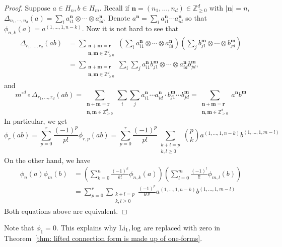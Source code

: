 \begin{proof}
Suppose $a\in H_n,b\in H_m$. Recall if $\mathbf n=(n_1,\dots,n_d)\in\mathbb Z_{\geq0}^d$ with $|\mathbf n|=n$, $\Delta_{n_1,\cdots,n_d}(a)=\sum_ia^{\mathbf n}_{i1}\otimes\cdots\otimes a^{\mathbf n}_{id}$. Denote $a^{\mathbf n}=\sum_ia^{\mathbf n}_{i1}\cdots a^{\mathbf n}_{id}$ so that $\phi_{n,k}(a)=a^{(1,\dots,1,n-k)}$. Now it is not hard to see that
\begin{align*}
\Delta_{r_1,\dots,r_d}(ab)&=\sum_{\substack{\mathbf n+\mathbf m=\mathbf r\\\mathbf n,\mathbf m\in\mathbb Z^d_{\geq0}}}\left(\sum_ia^{\mathbf n}_{i1}\otimes\cdots\otimes a^{\mathbf n}_{id}\right)\left(\sum_jb^{\mathbf m}_{j1}\otimes\cdots\otimes b^{\mathbf m}_{jd}\right)\\
&=\sum_{\substack{\mathbf n+\mathbf m=\mathbf r\\\mathbf n,\mathbf m\in\mathbb Z^d_{\geq0}}}\sum_i\sum_ja^{\mathbf n}_{i1}b^{\mathbf m}_{j1}\otimes\cdots\otimes a^{\mathbf n}_{id}b^{\mathbf m}_{jd},
\end{align*}
and
\[
m^{\circ d}\circ\Delta_{r_1,\dots,r_d}(ab)=\sum_{\substack{\mathbf n+\mathbf m=\mathbf r\\\mathbf n,\mathbf m\in\mathbb Z^d_{\geq0}}}\sum_i\sum_ja^{\mathbf n}_{i1}\cdots a^{\mathbf n}_{id}\cdot b^{\mathbf m}_{j1}\cdots b^{\mathbf m}_{jd}=\sum_{\substack{\mathbf n+\mathbf m=\mathbf r\\\mathbf n,\mathbf m\in\mathbb Z^d_{\geq0}}}a^{\mathbf n}b^{\mathbf m}
\]
In particular, we get
\begin{equation}
\phi_r(ab)=\sum_{p=0}^r\frac{(-1)^p}{p!}\phi_{r,p}(ab)=\sum_{p=0}^r\frac{(-1)^p}{p!}\sum_{\substack{k+l=p\\k,l\geq0}}\binom{p}{k}a^{(1,\dots,1,n-k)}b^{(1,\dots,1,m-l)}
\end{equation}
On the other hand, we have
\begin{equation}
\begin{aligned}
\phi_n(a)\phi_m(b)&=\left(\sum_{k=0}^n\frac{(-1)^k}{k!}\phi_{n,k}(a)\right)\left(\sum_{l=0}^m\frac{(-1)^l}{l!}\phi_{m,l}(b)\right)\\
&=\sum_{p=0}^r\sum_{\substack{k+l=p\\k,l\geq0}}\frac{(-1)^p}{k!l!}a^{(1,\dots,1,n-k)}b^{(1,\dots,1,m-l)}
\end{aligned}
\end{equation}
Both equations above are equivalent.
\end{proof}

\begin{remark}
Note that $\phi_1=0$. This explains why $\operatorname{Li}_1,\log$ are replaced with zero in Theorem~\ref{thm: lifted connection form is made up of one-forms}.
\end{remark}

